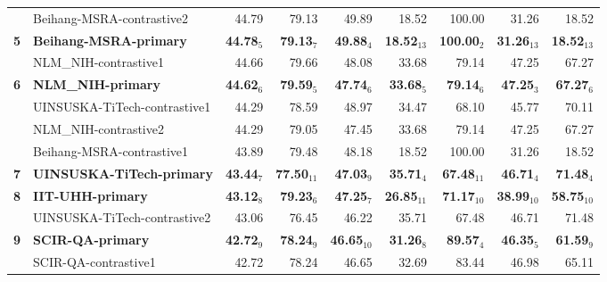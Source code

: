 \begin{table*}[tbh]
\begin{center}
\begin{tabular}{clrrrrrrr}
& Beihang-MSRA-contrastive2 & 44.79 & \scriptsize 79.13 & \scriptsize 49.89 & \scriptsize 18.52 & \scriptsize 100.00 & \scriptsize 31.26 & \scriptsize 18.52 \\
\bf 5 & \bf Beihang-MSRA-primary & \bf 44.78$_{5}$ & \bf \scriptsize 79.13$_{7}$ & \bf \scriptsize 49.88$_{4}$ & \bf \scriptsize 18.52$_{13}$ & \bf \scriptsize 100.00$_{2}$ & \bf \scriptsize 31.26$_{13}$ & \bf \scriptsize 18.52$_{13}$ \\
& NLM\_NIH-contrastive1 & 44.66 & \scriptsize 79.66 & \scriptsize 48.08 & \scriptsize 33.68 & \scriptsize 79.14 & \scriptsize 47.25 & \scriptsize 67.27 \\
\bf 6 & \bf NLM\_NIH-primary & \bf 44.62$_{6}$ & \bf \scriptsize 79.59$_{5}$ & \bf \scriptsize 47.74$_{6}$ & \bf \scriptsize 33.68$_{5}$ & \bf \scriptsize 79.14$_{6}$ & \bf \scriptsize 47.25$_{3}$ & \bf \scriptsize 67.27$_{6}$ \\
& UINSUSKA-TiTech-contrastive1 & 44.29 & \scriptsize 78.59 & \scriptsize 48.97 & \scriptsize 34.47 & \scriptsize 68.10 & \scriptsize 45.77 & \scriptsize 70.11 \\
& NLM\_NIH-contrastive2 & 44.29 & \scriptsize 79.05 & \scriptsize 47.45 & \scriptsize 33.68 & \scriptsize 79.14 & \scriptsize 47.25 & \scriptsize 67.27 \\
& Beihang-MSRA-contrastive1 & 43.89 & \scriptsize 79.48 & \scriptsize 48.18 & \scriptsize 18.52 & \scriptsize 100.00 & \scriptsize 31.26 & \scriptsize 18.52 \\
\bf 7 & \bf UINSUSKA-TiTech-primary & \bf 43.44$_{7}$ & \bf \scriptsize 77.50$_{11}$ & \bf \scriptsize 47.03$_{9}$ & \bf \scriptsize 35.71$_{4}$ & \bf \scriptsize 67.48$_{11}$ & \bf \scriptsize 46.71$_{4}$ & \bf \scriptsize 71.48$_{4}$ \\
\bf 8 & \bf IIT-UHH-primary & \bf 43.12$_{8}$ & \bf \scriptsize 79.23$_{6}$ & \bf \scriptsize 47.25$_{7}$ & \bf \scriptsize 26.85$_{11}$ & \bf \scriptsize 71.17$_{10}$ & \bf \scriptsize 38.99$_{10}$ & \bf \scriptsize 58.75$_{10}$ \\
& UINSUSKA-TiTech-contrastive2 & 43.06 & \scriptsize 76.45 & \scriptsize 46.22 & \scriptsize 35.71 & \scriptsize 67.48 & \scriptsize 46.71 & \scriptsize 71.48 \\
\bf 9 & \bf SCIR-QA-primary & \bf 42.72$_{9}$ & \bf \scriptsize 78.24$_{9}$ & \bf \scriptsize 46.65$_{10}$ & \bf \scriptsize 31.26$_{8}$ & \bf \scriptsize 89.57$_{4}$ & \bf \scriptsize 46.35$_{5}$ & \bf \scriptsize 61.59$_{9}$ \\
& SCIR-QA-contrastive1 & 42.72 & \scriptsize 78.24 & \scriptsize 46.65 & \scriptsize 32.69 & \scriptsize 83.44 & \scriptsize 46.98 & \scriptsize 65.11 \\

\end{tabular}
\end{center}
\end{table*}
